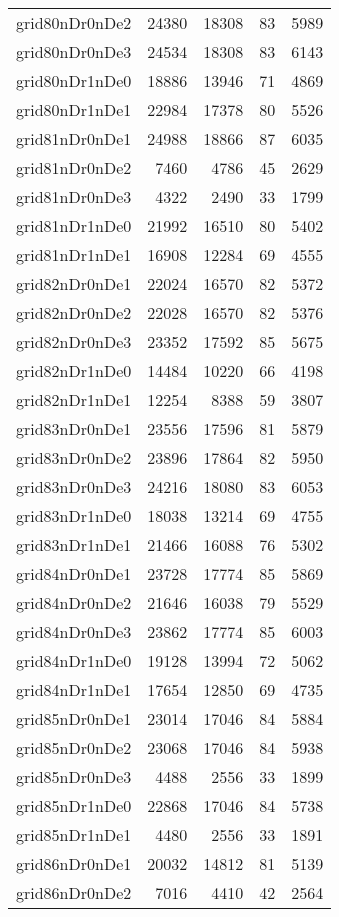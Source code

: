 \begin{tabular}{lrrrr}
grid80nDr0nDe2 & 24380 & 18308 & 83 & 5989 \\
grid80nDr0nDe3 & 24534 & 18308 & 83 & 6143 \\
grid80nDr1nDe0 & 18886 & 13946 & 71 & 4869 \\
grid80nDr1nDe1 & 22984 & 17378 & 80 & 5526 \\
grid81nDr0nDe1 & 24988 & 18866 & 87 & 6035 \\
grid81nDr0nDe2 & 7460 & 4786 & 45 & 2629 \\
grid81nDr0nDe3 & 4322 & 2490 & 33 & 1799 \\
grid81nDr1nDe0 & 21992 & 16510 & 80 & 5402 \\
grid81nDr1nDe1 & 16908 & 12284 & 69 & 4555 \\
grid82nDr0nDe1 & 22024 & 16570 & 82 & 5372 \\
grid82nDr0nDe2 & 22028 & 16570 & 82 & 5376 \\
grid82nDr0nDe3 & 23352 & 17592 & 85 & 5675 \\
grid82nDr1nDe0 & 14484 & 10220 & 66 & 4198 \\
grid82nDr1nDe1 & 12254 & 8388 & 59 & 3807 \\
grid83nDr0nDe1 & 23556 & 17596 & 81 & 5879 \\
grid83nDr0nDe2 & 23896 & 17864 & 82 & 5950 \\
grid83nDr0nDe3 & 24216 & 18080 & 83 & 6053 \\
grid83nDr1nDe0 & 18038 & 13214 & 69 & 4755 \\
grid83nDr1nDe1 & 21466 & 16088 & 76 & 5302 \\
grid84nDr0nDe1 & 23728 & 17774 & 85 & 5869 \\
grid84nDr0nDe2 & 21646 & 16038 & 79 & 5529 \\
grid84nDr0nDe3 & 23862 & 17774 & 85 & 6003 \\
grid84nDr1nDe0 & 19128 & 13994 & 72 & 5062 \\
grid84nDr1nDe1 & 17654 & 12850 & 69 & 4735 \\
grid85nDr0nDe1 & 23014 & 17046 & 84 & 5884 \\
grid85nDr0nDe2 & 23068 & 17046 & 84 & 5938 \\
grid85nDr0nDe3 & 4488 & 2556 & 33 & 1899 \\
grid85nDr1nDe0 & 22868 & 17046 & 84 & 5738 \\
grid85nDr1nDe1 & 4480 & 2556 & 33 & 1891 \\
grid86nDr0nDe1 & 20032 & 14812 & 81 & 5139 \\
grid86nDr0nDe2 & 7016 & 4410 & 42 & 2564 \\

\end{tabular}
